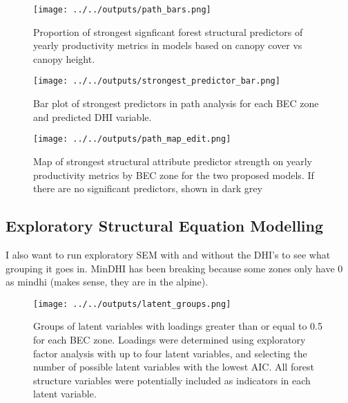\documentclass[
  authoryear,
  review,
  3p,
  twocolumn]{elsarticle}
\begin{document}
\begin{figure}

{\centering \texttt{[image: ../../outputs/path\_bars.png]}

}

\caption{\label{fig-pathbar-prop}Proportion of strongest signficant
forest structural predictors of yearly productivity metrics in models
based on canopy cover vs canopy height.}

\end{figure}

\begin{figure}

{\centering \texttt{[image: ../../outputs/strongest\_predictor\_bar.png]}

}

\caption{\label{fig-pathbar-pred}Bar plot of strongest predictors in
path analysis for each BEC zone and predicted DHI variable.}

\end{figure}

\begin{figure}

{\centering \texttt{[image: ../../outputs/path\_map\_edit.png]}

}

\caption{\label{fig-pathmap}Map of strongest structural attribute
predictor strength on yearly productivity metrics by BEC zone for the
two proposed models. If there are no significant predictors, shown in
dark grey}

\end{figure}

\hypertarget{exploratory-structural-equation-modelling-1}{%
\subsection{Exploratory Structural Equation
Modelling}\label{exploratory-structural-equation-modelling-1}}

I also want to run exploratory SEM with and without the DHI's to see
what grouping it goes in. MinDHI has been breaking because some zones
only have 0 as mindhi (makes sense, they are in the alpine).

\begin{figure}

{\centering \texttt{[image: ../../outputs/latent\_groups.png]}

}

\caption{\label{fig-esem-latent}Groups of latent variables with loadings
greater than or equal to 0.5 for each BEC zone. Loadings were determined
using exploratory factor analysis with up to four latent variables, and
selecting the number of possible latent variables with the lowest AIC.
All forest structure variables were potentially included as indicators
in each latent variable.}

\end{figure}
\end{document}
